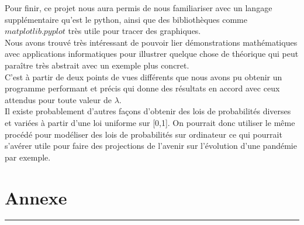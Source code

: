 \documentclass[12,french]{report}
\begin{document}
Pour finir, ce projet nous aura permis de nous familiariser avec un langage supplémentaire qu'est le python, ainsi que des bibliothèques comme $matplotlib.pyplot$ très utile pour tracer des graphiques.\\

Nous avons trouvé très intéressant de pouvoir lier démonstrations mathématiques avec applications informatiques pour illustrer quelque chose de théorique qui peut paraître très abstrait avec un exemple plus concret.\\

C'est à partir de deux points de vues différents que nous avons pu obtenir un programme performant et précis qui donne des résultats en accord avec ceux attendus pour toute valeur de $\lambda$.\\

Il existe probablement d'autres façons d'obtenir des lois de probabilités diverses et variées à partir d'une loi uniforme sur [0,1]. On pourrait donc utiliser le même procédé pour modéliser des lois de probabilités sur ordinateur ce qui pourrait s'avérer utile pour faire des projections de l'avenir sur l'évolution d'une pandémie par exemple. 

\chapter*{Annexe}

\hrule
\begin{lstlisting}[caption=Programme en Python]
	
\end{lstlisting}


\end{document}
